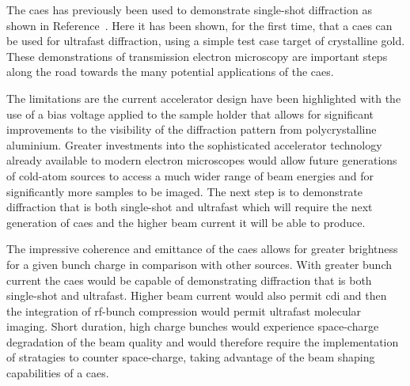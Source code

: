 The \gls{caes} has previously been used to demonstrate single-shot diffraction as shown in Reference~\cite{speirs_single-shot_2015}.
Here it has been shown, for the first time, that a \gls{caes} can be used for ultrafast diffraction, using a simple test case target of crystalline gold.
These demonstrations of transmission electron microscopy are important steps along the road towards the many potential applications of the \gls{caes}.

The limitations are the current accelerator design have been highlighted with the use of a bias voltage applied to the sample holder that allows for significant improvements to the visibility of the diffraction pattern from polycrystalline aluminium.
Greater investments into the sophisticated accelerator technology already available to modern electron microscopes would allow future generations of cold-atom sources to access a much wider range of beam energies and for significantly more samples to be imaged.
The next step is to demonstrate diffraction that is both single-shot and ultrafast which will require the next generation of \gls{caes} and the higher beam current it will be able to produce.

The impressive coherence and emittance of the \gls{caes} allows for greater brightness for a given bunch charge in comparison with other sources.
With greater bunch current the \gls{caes} would be capable of demonstrating diffraction that is both single-shot and ultrafast.
Higher beam current would also permit \gls{cdi} and then the integration of rf-bunch compression would permit ultrafast molecular imaging.
Short duration, high charge bunches would experience space-charge degradation of the beam quality and would therefore require the implementation of stratagies to counter space-charge, taking advantage of the beam shaping capabilities of a \gls{caes}.